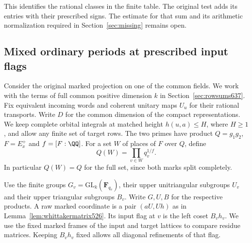 \documentclass[a4paper,11pt]{article}
\theoremstyle{definition}
\theoremstyle{remark}
\numberwithin{equation}{section}
\begin{document}
This identifies the rational classes in the finite table.
The original test adds its entries with their prescribed
signs. The estimate for that sum and its arithmetic
normalization required in Section~\ref{sec:missing} remains open.


\subsection{Mixed ordinary periods at prescribed input flags}
\label{sec:partialflags653}

Consider the original marked projection on one of the common
fields. We work with the terms of full common positive dimension
\(k\) in Section~\ref{sec:rowsums637}. Fix equivalent incoming
words and coherent unitary maps \(U_u\) for their rational
transports. Write \(D\) for the common dimension of the compact
representations. We keep complete orbital integrals at matched
height \(h(u,a)\le H\), where \(H\ge1\), and allow any finite
set of target rows. The two primes have product \(Q=g_1g_2\),
\(F=E_x^+\) and \(f=[F:\QQ]\). For a set \(W\) of places of
\(F\) over \(Q\), define
\[
                Q(W)=\prod_{v\in W}q_v^{1/f}.
\]
In particular \(Q(W)=Q\) for the full set, since both marks
split completely.

Use the finite groups \(G_v=\mathrm{GL}_k(\mathbf F_{q_v})\),
their upper unitriangular subgroups \(U_v\) and their upper
triangular subgroups \(B_v\). Write \(G,U,B\) for the respective
products. A raw marked coordinate is a pair
\((aU,Uh)\) as in Lemma~\ref{lem:whittakermatrix526}.
Its input flag at \(v\) is the left coset \(B_vh_v\).
We use the fixed marked frames of the input and target lattices
to compare residue matrices. Keeping \(B_vh_v\) fixed allows
all diagonal refinements of that flag.
\end{document}
